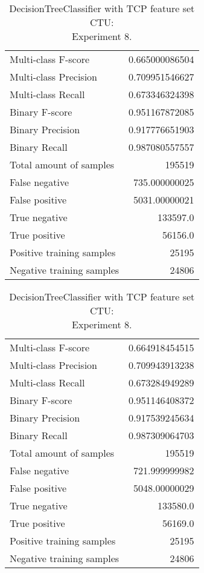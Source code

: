\begin{table}[H]
\begin{minipage}{0.5\textwidth}
\caption{DecisionTreeClassifier with TCP feature set CTU: \\Experiment 7.}
\centering
\begin{tabular}{l r}
\toprule
Multi-class F-score & 0.665000086504 \\
Multi-class Precision & 0.709951546627 \\
Multi-class Recall & 0.673346324398 \\
\midrule
Binary F-score & 0.951167872085 \\
Binary Precision & 0.917776651903 \\
Binary Recall & 0.987080557557 \\
\midrule
Total amount of samples & 195519 \\
False negative & 735.000000025 \\
False positive & 5031.00000021 \\
True negative & 133597.0 \\
True positive & 56156.0 \\
\midrule
Positive training samples & 25195 \\
Negative training samples & 24806 \\
\bottomrule
\end{tabular}
\end{minipage}
\hfillx
\begin{minipage}{0.5\textwidth}
\caption{DecisionTreeClassifier with TCP feature set CTU: \\Experiment 8.}
\centering
\begin{tabular}{l r}
\toprule
Multi-class F-score & 0.664918454515 \\
Multi-class Precision & 0.709943913238 \\
Multi-class Recall & 0.673284949289 \\
\midrule
Binary F-score & 0.951146408372 \\
Binary Precision & 0.917539245634 \\
Binary Recall & 0.987309064703 \\
\midrule
Total amount of samples & 195519 \\
False negative & 721.999999982 \\
False positive & 5048.00000029 \\
True negative & 133580.0 \\
True positive & 56169.0 \\
\midrule
Positive training samples & 25195 \\
Negative training samples & 24806 \\
\bottomrule
\end{tabular}
\end{minipage}
\end{table}
